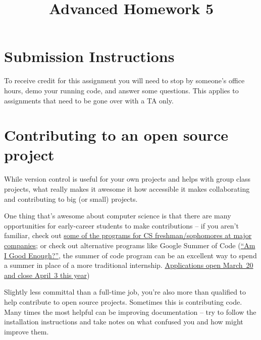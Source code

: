 \documentclass{article}
\begin{document}
\fancyfoot[C]{\color{gray} \thepage~/~\pageref*{LastPage}}
\pagestyle{fancyplain}

\title{\textbf{Advanced Homework 5\\}}
\author{\textbf{\color{red}{Due: Wednesday, October 18th, 11:59PM (Hard Deadline)}}}
\date{}
\maketitle


\section*{Submission Instructions}
To receive credit for this assignment you will need to stop by someone's
office hours, demo your running code, and answer some questions. \textbf{\color{red}{Make sure
to check the office hour schedule as the real due date is at the last office
hours before the date listed above.}} This applies to assignments that need to be gone over with a TA only.


\section*{Contributing to an open source project}

While version control is useful for your own projects and helps with group
class projects, what really makes it awesome it how accessible it makes
collaborating and contributing to big (or small) projects.

One thing that's awesome about computer science is that there are many
opportunities for early-career students to make contributions -- if you aren't
familiar, check out
\href{https://www.quora.com/What-companies-have-internship-programs-specifically-for-college-freshmen-and-sophomores}{some
  of the programs for CS freshman/sophomores at major companies}; or check out
alternative programs like Google Summer of Code
(\href{http://write.flossmanuals.net/gsocstudentguide/am-i-good-enough/}
{``Am I Good Enough?''}, the summer of code program can be an excellent way to
spend a summer in place of a more traditional internship.
\href{https://developers.google.com/open-source/gsoc/timeline}
  {Applications open March~20 and close April~3 this year})

Slightly less committal than a full-time job, you're also more than qualified
to help contribute to open source projects. Sometimes this is contributing
code. Many times the most helpful can be improving documentation -- try to
follow the installation instructions and take notes on what confused you and
how might improve them.
\end{document}
